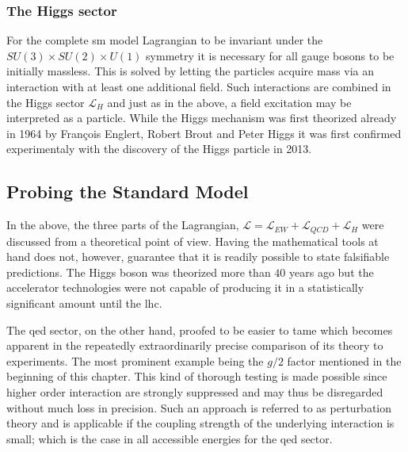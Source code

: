 \subsubsection{The Higgs sector}
\label{sec:higgs}

For the complete \gls{sm} model Lagrangian to be invariant under the $SU(3)\times SU(2) \times U(1)$ symmetry it is necessary for all gauge bosons to be initially massless. This is solved by letting the particles acquire mass via an interaction with at least one additional field. Such interactions are combined in the Higgs sector $\mathcal{L}_H$ and just as in the above, a field excitation may be interpreted as a particle. While the Higgs mechanism was first theorized already in 1964 by François Englert, Robert Brout \cite{Englert1964} and Peter Higgs \cite{Higgs1964} it was first confirmed experimentaly with the discovery of the Higgs particle in 2013.


\subsection{Probing the Standard Model}
\label{sec:prob-sm}

In the above, the three parts of the Lagrangian, $\mathcal{L} = \mathcal{L}_{EW} + \mathcal{L}_{QCD} + \mathcal{L}_{H}$ were discussed from a theoretical point of view. Having the mathematical tools at hand does not, however, guarantee that it is readily possible to state falsifiable predictions. The Higgs boson was theorized more than $40$ years ago but the accelerator technologies were not capable of producing it in a statistically significant amount until the \gls{lhc}. 

The \gls{qed} sector, on the other hand, proofed to be easier to tame which becomes apparent in the repeatedly extraordinarily precise comparison of its theory to experiments. The most prominent example being the $g/2$ factor mentioned in the beginning of this chapter. This kind of thorough testing is made possible since higher order interaction are strongly suppressed and may thus be disregarded without much loss in precision. Such an approach is referred to as perturbation theory and is applicable if the coupling strength of the underlying interaction is small; which is the case in all accessible energies for the \gls{qed} sector.

